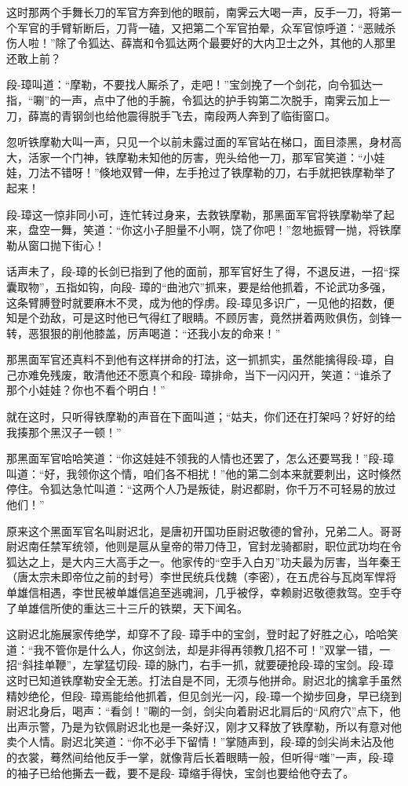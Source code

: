 \documentclass[12pt,oneside]{book}
\begin{document}
这时那两个手舞长刀的军官方奔到他的眼前，南霁云大喝一声，反手一刀，将第一个军官的手臂斩断后，刀背一磕，又把第二个军官拍晕，众军官惊呼道：``恶贼杀伤人啦！''除了令狐达、薛嵩和令狐达两个最要好的大内卫士之外，其他的人那里还敢上前？

段-璋叫道：``摩勒，不要找人厮杀了，走吧！''宝剑挽了一个剑花，向令狐达一指，``唰''的一声，点中了他的手腕，令狐达的护手钩第二次脱手，南霁云加上一刀，薛嵩的青钢剑也给他震得脱手飞去，南段两人奔到了临街窗口。

忽听铁摩勒大叫一声，只见一个以前未露过面的军官站在梯口，面目漆黑，身材高大，活家一个门神，铁摩勒未知他的厉害，兜头给他一刀，那军官笑道：``小娃娃，刀法不错呀！''倏地双臂一伸，左手抢过了铁摩勒的刀，右手就把铁摩勒举了起来！

段-璋这一惊非同小可，连忙转过身来，去救铁摩勒，那黑面军官将铁摩勒举了起来，盘空一舞，笑道：``你这小子胆量不小啊，饶了你吧！''忽地振臂一抛，将铁摩勒从窗口抛下街心！

话声未了，段-璋的长剑已指到了他的面前，那军官好生了得，不退反进，一招``探囊取物''，五指如钩，向段-
璋的``曲池穴''抓来，要是给他抓着，不论武功多强，这条臂膊登时就要麻木不灵，成为他的俘虏。段-璋见多识广，一见他的招数，便知是个劲敌，可是这时他已气得红了眼睛。不顾厉害，竟然拼着两败俱伤，剑锋一转，恶狠狠的削他膝盖，厉声喝道：``还我小友的命来！''

那黑面军官还真料不到他有这样拼命的打法，这一抓抓实，虽然能擒得段-璋，自己亦难免残废，敢清他还不愿真个和段-
璋排命，当下一闪闪开，笑道：``谁杀了那个小娃娃？你也不看个明白！''

就在这时，只听得铁摩勒的声音在下面叫道；``姑夫，你们还在打架吗？好好的给我揍那个黑汉子一顿！''

那黑面军官哈哈笑道：``你这娃娃不领我的人情也还罢了，怎么还要骂我！''段-璋叫道：``好，我领你这个情，咱们各不相扰！''他的第二剑本来就要刺出，这时倏然停住。令狐达急忙叫道：``这两个人乃是叛徒，尉迟都尉，你千万不可轻易的放过他们！''

原来这个黑面军官名叫尉迟北，是唐初开国功臣尉迟敬德的曾孙，兄弟二人。哥哥尉迟南任禁军统领，他则是扈从皇帝的带刀侍卫，官封龙骑都尉，职位武功均在令狐达之上，是大内三大高手之一。他家传的``空手入白刃''功夫最为厉害，当年秦王（唐太宗未即帝位之前的封号）李世民统兵伐魏（李密），在五虎谷与瓦岗军悍将单雄信相遇，李世民被单雄信追至逃魂涧，几乎被俘，幸赖尉迟敬德救驾。空手夺了单雄信所使的重达三十三斤的铁槊，天下闻名。

这尉迟北施展家传绝学，却穿不了段-
璋手中的宝剑，登时起了好胜之心，哈哈笑道：``我不管你是什么人，你这剑法，却是非得再领教几招不可！''双掌一错，一招``斜挂单鞭''，左掌猛切段-
璋的脉门，右手一抓，就要硬抢段-璋的宝剑。段-璋这时已知道铁摩勒安全无恙。打法自是不同，无须与他拼命。尉迟北的擒拿手虽然精妙绝伦，但段-
璋焉能给他抓着，但见剑光一闪，段-璋一个拗步回身，早已绕到尉迟北身后，喝声：``看剑！''唰的一剑，剑尖向着尉迟北肩后的``风府穴''点下，他出声示警，乃是为钦佩尉迟北也是一条好汉，刚才又释放了铁摩勒，所以有意对他卖个人情。尉迟北笑道：``你不必手下留情！''掌随声到，段-璋的剑尖尚未沾及他的衣裳，蓦然间给他反手一掌，就像背后长着眼睛一般，但听得``嗤''一声，段-璋的袖子已给他撕去一截，要不是段-
璋缩手得快，宝剑也要给他夺去了。
\end{document}
